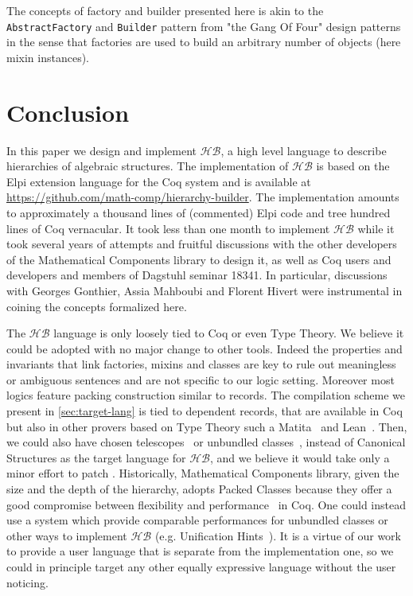 \documentclass[a4paper,UKenglish,cleveref, autoref]{lipics-v2019}
\newcommand{\HB}{\ensuremath{\mathcal{HB}}}
\newcommand{\mixin}{mixin}
\newcommand{\mixins}{mixins}
\newcommand{\factory}{factory}
\newcommand{\factories}{factories}
\newcommand{\builder}{builder}
\newcommand{\classes}{classes}
\theoremstyle{implem}
\theoremstyle{implem}
\theoremstyle{command}
\begin{document}
{{The concepts of \factory{} and \builder{} presented here is akin to the
\verb-AbstractFactory- and \verb-Builder- pattern from "the Gang Of Four" design
patterns~\cite{gamma1995design} in the sense that \factories{} are used
to build an arbitrary number of objects (here \mixin{} instances).

\section{Conclusion}
In this paper we design and implement \HB{}, a high level language to describe
hierarchies of algebraic structures. The implementation of \HB{} is
based on the Elpi extension language for the Coq system and is available
at \url{https://github.com/math-comp/hierarchy-builder}.
The implementation amounts to approximately a thousand lines of (commented)
Elpi code and tree hundred lines of Coq vernacular. It took less than one month
to implement \HB{} while it took several years of attempts and fruitful
discussions with the other developers of the Mathematical Components library
to design it, as well as Coq users and developers and members of Dagstuhl seminar 18341.
In particular, discussions with Georges Gonthier, Assia Mahboubi and
Florent Hivert were instrumental in coining the concepts formalized here.

The \HB{} language is only loosely tied to Coq or even Type Theory.
We believe it could be adopted with no major change to other tools. Indeed the
properties and invariants that link \factories{}, \mixins{} and \classes{}
are key to rule out meaningless or ambiguous sentences and are not
specific to our logic setting. Moreover
most logics feature packing construction similar to records.
The compilation scheme we present in \autoref{sec:target-lang} is tied to dependent records,
that are available in Coq but also
in other provers based on Type Theory such a Matita~\cite{DBLP:conf/cade/AspertiRCT11}
and Lean~\cite{DBLP:conf/cade/MouraKADR15}.
Then, we could also have chosen telescopes~\cite{telescopes} or unbundled
classes~\cite{mathclasses}, instead of Canonical Structures as the target language for \HB{},
and we believe it would take only a minor effort to patch .
Historically, Mathematical Components library, given the size and
the depth of the hierarchy, adopts Packed Classes because they offer a good
compromise between flexibility and performance~\cite[Section 8]{DBLP:conf/itp/MahboubiT13} in Coq.
One could instead use a system which provide comparable
performances for unbundled classes or other ways to implement \HB{}
(e.g. Unification Hints~\cite{10.1007/978-3-642-03359-9_8}).
It is a virtue of our work to provide a user language that is separate
from the implementation one, so we could in principle target any other
equally expressive language without the user noticing.


}}
\end{document}
